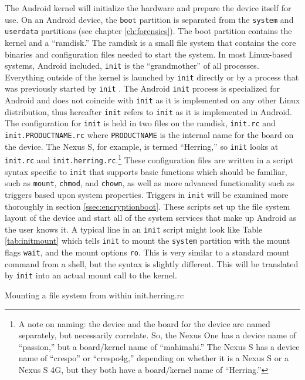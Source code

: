 The Android kernel will initialize the hardware and prepare the device itself for use. On an Android device, the \texttt{boot}
partition is separated from the \texttt{system} and \texttt{userdata} partitions (see chapter \ref{ch:forensics}). The boot
partition contains the kernel and a ``ramdisk.''  The ramdisk is a small file system that contains the core binaries and
configuration files needed to start the system. In most Linux-based systems, Android included, \texttt{init} is the ``grandmother''
of all processes. Everything outside of the kernel is launched by \texttt{init} directly or by a process that was
previously started by \texttt{init} \cite{eneaboot}. The Android \texttt{init} process is specialized for Android and does not coincide with
\texttt{init} as it is implemented on any other Linux distribution, thus hereafter \texttt{init} refers to \texttt{init} as it is
implemented in Android.  The configuration for \texttt{init} is held in two files on the ramdisk, \texttt{init.rc} and
\texttt{init.PRODUCTNAME.rc} where \texttt{PRODUCTNAME} is the internal name for the board on the device. The Nexus S, for example, is termed
``Herring,'' so \texttt{init} looks at \texttt{init.rc} and \texttt{init.herring.rc}.\footnote{A note on naming: the device and the
board for the device are named separately, but necessarily correlate. So, the Nexus One has a device name of ``passion,'' but a
board/kernel name of ``mahimahi.'' The Nexus S has a device name of ``crespo'' or ``crespo4g,'' depending on whether it is a Nexus S
or a Nexus S 4G, but they both have a board/kernel name of ``Herring.''} These configuration files are written in a script syntax
specific to \texttt{init} that supports basic functions which should be familiar, such as \texttt{mount}, \texttt{chmod}, and
\texttt{chown}, as well as more advanced functionality such as triggers based upon system properties.  Triggers in \texttt{init}
will be examined more thoroughly in section \ref{ssec:encryptionboot}. These scripts set up the file system layout of the device and
start all of the system services that make up Android as the user knows it. A typical line in an \texttt{init} script might look
like Table \ref{tab:initmount} which tells \texttt{init} to mount the \texttt{system} partition with the mount flags \texttt{wait}, and the mount
options \texttt{ro}. This is very similar to a standard mount command from a shell, but the syntax is slightly different. This will
be translated by \texttt{init} into an actual mount call to the kernel. 
\begin{table}[htb]

\caption{Mounting a file system from within init.herring.rc}
\label{tab:initmount}
\end{table}


